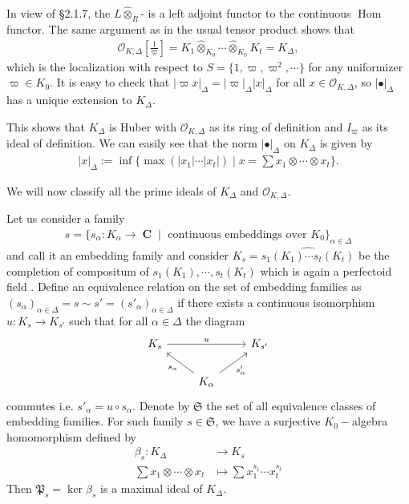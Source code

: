 \documentclass[12pts,a4paper]{amsart}
\DeclareMathOperator{\Hom}{Hom}
\DeclareMathOperator{\C}{\textbf{C}}
\begin{document}
In view of \cite{BGR} \S 2.1.7, the $L\hat{\otimes}_R$- is a left adjoint functor to the continuous $\Hom$ functor. The same argument as in the usual tensor product shows that
\begin{align*}
	\mathcal{O}_{K,\Delta}\left[\frac{1}{\varpi}\right]=K_1\hat{\otimes}_{K_0}\cdots\hat{\otimes}_{K_0} K_t=K_\Delta,
\end{align*}
which is the localization with respect to $S=\{1,\varpi,\varpi^2,\cdots\}$ for any uniformizer $\varpi\in K_0$. It is easy to check that $|\varpi x|_\Delta=|\varpi|_\Delta|x|_\Delta$ for all $x\in\mathcal{O}_{K,\Delta}$, so $|\bullet|_\Delta$ has a unique extension to $K_\Delta$. 

This shows that $K_\Delta$ is Huber with $\mathcal{O}_{K,\Delta}$ as its ring of definition and $I_\varpi$ as its ideal of definition. We can easily see that the norm $|\bullet|_\Delta$ on $K_\Delta$ is given by
\begin{align*}
	|x|_\Delta:=\inf\Big\{\max(|x_1|\cdots|x_t|)\mid x=\sum x_1\otimes\cdots\otimes x_t\Big\}.
\end{align*}


We will now classify all the prime ideals of $K_\Delta$ and $\mathcal{O}_{K,\Delta}$.

Let us consider a family 
\begin{align*}
	s=\big\{s_\alpha: K_\alpha\to \C \mid\text{ continuous embeddings over }K_0\big\}_{\alpha\in\Delta}
\end{align*}
and call it an embedding family and consider $K_s=\widehat{s_1(K_1)\cdots s_t(K_t)}$ be the completion of compositum of $s_1(K_1),\cdots,s_t(K_t)$ which is again a perfectoid field . Define an equivalence relation on the set of embedding families as $(s_\alpha)_{\alpha\in\Delta}=s\sim s'=(s'_\alpha)_{\alpha\in\Delta}$ if there exists a continuous isomorphism $u: K_s\to K_{s'}$ such that for all $\alpha\in\Delta$ the diagram
\[
\begin{tikzcd}
	K_s\arrow[rr,"u"] &  &  K_{s'}\\
	        & \arrow[ul,"s_\alpha"]  K_\alpha \arrow[ur,swap,"s'_\alpha"]   &
\end{tikzcd}
\]
commutes i.e. $s'_\alpha=u\circ s_\alpha$. 
 Denote by $\mathfrak{S}$ the set of all equivalence classes of embedding families. For such family $s\in\mathfrak{S}$, we have a surjective $K_0-$algebra homomorphism defined by
\begin{align*}
	\beta_s: K_\Delta &\to K_s\\
	       \sum x_1\otimes\cdots\otimes x_t&\mapsto \sum x^{s_1}_1\cdots x^{s_t}_t
\end{align*}
Then $\mathfrak{P}_s=\ker\beta_s$ is a maximal ideal of $K_\Delta$.
\end{document}
